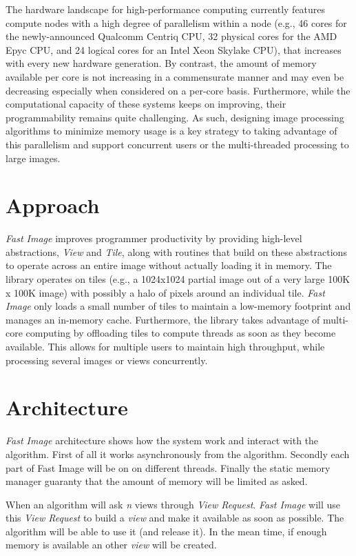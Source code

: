 The hardware landscape for high-\/performance computing currently features compute nodes with a high degree of parallelism within a node (e.\+g., 46 cores for the newly-\/announced Qualcomm Centriq C\+PU, 32 physical cores for the A\+MD Epyc C\+PU, and 24 logical cores for an Intel Xeon Skylake C\+PU), that increases with every new hardware generation. By contrast, the amount of memory available per core is not increasing in a commensurate manner and may even be decreasing especially when considered on a per-\/core basis. Furthermore, while the computational capacity of these systems keeps on improving, their programmability remains quite challenging. As such, designing image processing algorithms to minimize memory usage is a key strategy to taking advantage of this parallelism and support concurrent users or the multi-\/threaded processing to large images.

\section*{Approach}

{\itshape Fast Image} improves programmer productivity by providing high-\/level abstractions, {\itshape View} and {\itshape Tile}, along with routines that build on these abstractions to operate across an entire image without actually loading it in memory. The library operates on tiles (e.\+g., a 1024x1024 partial image out of a very large 100K x 100K image) with possibly a halo of pixels around an individual tile. {\itshape Fast Image} only loads a small number of tiles to maintain a low-\/memory footprint and manages an in-\/memory cache. Furthermore, the library takes advantage of multi-\/core computing by offloading tiles to compute threads as soon as they become available. This allows for multiple users to maintain high throughput, while processing several images or views concurrently.

\section*{Architecture}

{\itshape Fast Image} architecture shows how the system work and interact with the algorithm. First of all it works asynchronously from the algorithm. Secondly each part of Fast Image will be on on different threads. Finally the static memory manager guaranty that the amount of memory will be limited as asked.

When an algorithm will ask {\itshape n} views through {\itshape View Request}. {\itshape Fast Image} will use this {\itshape View Request} to build a {\itshape view} and make it available as soon as possible. The algorithm will be able to use it (and release it). In the mean time, if enough memory is available an other {\itshape view} will be created.

